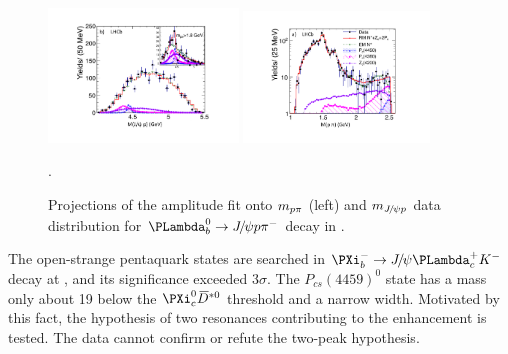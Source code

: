 \begin{figure}[!hbtp]
\centering
   \includegraphics[width=0.45\textwidth]{Figures/01_Introduction/Exotic/Pc_states/lhcb-Lb2jpsippi-mjpsip-inset-slo} %
   \includegraphics[width=0.44\textwidth]{Figures/01_Introduction/Exotic/Pc_states/lhcb-Lb2jpsippi-mppi-slo} %
   \caption{ 
   Projections of the amplitude fit onto $m_{{p}\pi}$ (left) and $m_{{{J\mskip -3mu/\mskip -2mu\psi}}{p}}$ data distribution for $\Lb\to\jpsi\proton\pim$ decay 
   in \lhcb\supercite{LHCb-PAPER-2016-015}.}.
\label{fig:Pc_jpsipi}
\end{figure}

The open-strange pentaquark states are searched in $\Xibm\to\jpsi\Lc\Km$ decay at \lhcb\supercite{LHCb-PAPER-2020-039},
and its significance exceeded $3\sigma$.
The $P_{cs}(4459)^0$ state has a mass only about 19 \mev below the $\Xicz\Dstarzb$
threshold and a narrow width. 
Motivated by this fact, 
the hypothesis of two resonances contributing to the enhancement is tested.
The data cannot confirm or refute the two-peak hypothesis. 

























